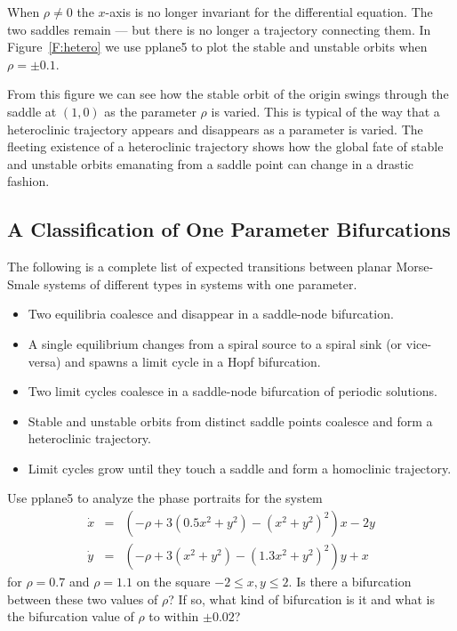 \documentclass{ximera}
\begin{document}
When $\rho\neq 0$ the $x$-axis is no longer invariant for the differential 
equation.  The two saddles remain --- but there is no longer a 
trajectory connecting them.  In Figure~\ref{F:hetero} we use 
{\sf pplane5} 
to plot the stable and unstable orbits when $\rho=\pm 0.1$.

From this figure we can see how the stable orbit of the origin swings 
through the saddle at $(1,0)$ as the parameter $\rho$ is varied.  This
is typical of the way that a heteroclinic trajectory appears and disappears 
as a parameter is varied.  The fleeting existence of a heteroclinic trajectory
shows how the global fate of stable and unstable orbits emanating from a 
saddle point can change in a drastic fashion. 


\subsection*{A Classification of One Parameter Bifurcations}

The following is a complete list of expected transitions between planar 
Morse-Smale systems of different types in systems with one parameter.
\begin{itemize}
\item	Two equilibria coalesce and disappear in a saddle-node bifurcation.
\item	A single equilibrium changes from a spiral source to a spiral sink (or 
vice-versa) and spawns a limit cycle in a Hopf bifurcation.
\item	Two limit cycles coalesce in a saddle-node bifurcation of 
periodic solutions.
\item	Stable and unstable orbits from distinct saddle points
coalesce and form a heteroclinic trajectory.
\item	Limit cycles grow until they touch a saddle and form a homoclinic 
trajectory.
\end{itemize}


\EXER

\CEXER

\begin{exercise} \label{c9.5.1}
Use {\sf pplane5} to analyze the phase portraits for the system
\begin{equation*}
\begin{array}{rcl}
\dot{x} & = & (-\rho+3(0.5x^2+y^2)-(x^2+y^2)^2)x-2y \\
\dot{y} & = & (-\rho+3(x^2+y^2)-(1.3x^2+y^2)^2)y+x
\end{array}
\end{equation*}
for $\rho=0.7$ and $\rho=1.1$ on the square $-2\leq x,y\leq 2$.  Is there 
a bifurcation between these two values of $\rho$?  If so, what kind of 
bifurcation is it and what is the bifurcation value of $\rho$ to within 
$\pm 0.02$?
\end{exercise}
\end{document}
